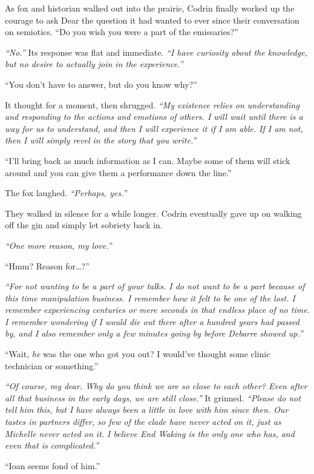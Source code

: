 As fox and historian walked out into the prairie, Codrin finally worked up the courage to ask Dear the question it had wanted to ever since their conversation on semiotics. ``Do you wish you were a part of the emissaries?''

\emph{``No.''} Its response was flat and immediate. \emph{``I have curiosity about the knowledge, but no desire to actually join in the experience.''}

``You don't have to answer, but do you know why?''

It thought for a moment, then shrugged. \emph{``My existence relies on understanding and responding to the actions and emotions of others. I will wait until there is a way for us to understand, and then I will experience it if I am able. If I am not, then I will simply revel in the story that you write.''}

``I'll bring back as much information as I can. Maybe some of them will stick around and you can give them a performance down the line.''

The fox laughed. \emph{``Perhaps, yes.''}

They walked in silence for a while longer. Codrin eventually gave up on walking off the gin and simply let sobriety back in.

\emph{``One more reason, my love.''}

``Hmm? Reason for\ldots?''

\emph{``For not wanting to be a part of your talks. I do not want to be a part because of this time manipulation business. I remember how it felt to be one of the lost. I remember experiencing centuries or mere seconds in that endless place of no time. I remember wondering if I would die out there after a hundred years had passed by, and I also remember only a few minutes going by before Debarre showed up.''}

``Wait, \emph{he} was the one who got you out? I would've thought some clinic technician or something.''

\emph{``Of course, my dear. Why do you think we are so close to each other? Even after all that business in the early days, we are still close.''} It grinned. \emph{``Please do not tell him this, but I have always been a little in love with him since then. Our tastes in partners differ, so few of the clade have never acted on it, just as Michelle never acted on it.  I believe End Waking is the only one who has, and even that is complicated.''}

``Ioan seems fond of him.''

